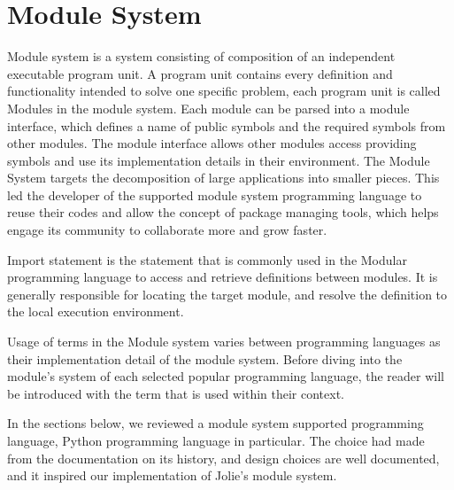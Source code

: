 \FloatBarrier






\section{Module System}

Module system is a system consisting of composition of an independent executable program unit. A program unit contains every definition and functionality intended to solve one specific problem, each program unit is called Modules in the module system. Each module can be parsed into a module interface, which defines a name of public symbols and the required symbols from other modules. The module interface allows other modules access providing symbols and use its implementation details in their environment. The Module System targets the decomposition of large applications into smaller pieces. This led the developer of the supported module system programming language to reuse their codes and allow the concept of package managing tools, which helps engage its community to collaborate more and grow faster.

Import statement is the statement that is commonly used in the Modular programming language to access and retrieve definitions between modules. It is generally responsible for locating the target module, and resolve the definition to the local execution environment.

Usage of terms in the Module system varies between programming languages as their implementation detail of the module system. Before diving into the module's system of each selected popular programming language, the reader will be introduced with the term that is used within their context.

In the sections below, we reviewed a module system supported programming language, Python programming language in particular. The choice had made from the documentation on its history, and design choices are well documented, and it inspired our implementation of Jolie's module system.


